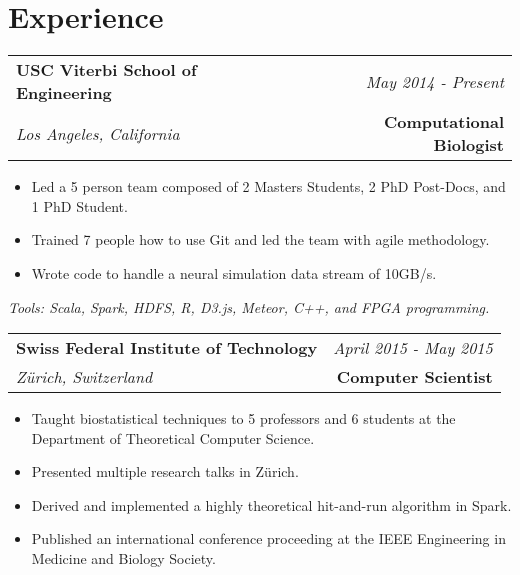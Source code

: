\documentclass[10pt,a4paper]{article}
\begin{document}
  \vspace*{-15mm}\section*{Experience}
  \noindent\begin{tabularx}{17cm}{X r}
    \textbf{USC Viterbi School of Engineering} & \textit{May 2014 - Present} \\
    \textit{Los Angeles, California} & \textbf{Computational Biologist} \\
  \end{tabularx}

  \vspace*{1mm}\noindent\begin{minipage}{17cm}
    \begin{itemize}[leftmargin=6mm,topsep=0mm,itemsep=-1mm]
      \item Led a 5 person team composed of 2 Masters Students, 2 PhD Post-Docs, and 1 PhD Student.
      \item Trained 7 people how to use Git and led the team with agile methodology.
      \item Wrote code to handle a neural simulation data stream of 10GB/s.
    \end{itemize}
  \end{minipage}

  \vspace*{2mm}\setlength\parindent{2mm}\begin{minipage}{16.8cm}
    \textit{Tools: Scala, Spark, HDFS, R, D3.js, Meteor, C++, and FPGA programming.}
  \end{minipage}

  \vspace*{3mm}\noindent\begin{tabularx}{17cm}{X r}
    \textbf{Swiss Federal Institute of Technology} & \textit{April 2015 - May 2015} \\
    \textit{Z{\"u}rich, Switzerland} & \textbf{Computer Scientist} \\
  \end{tabularx}

  \vspace*{1mm}\noindent\begin{minipage}{17cm}
    \begin{itemize}[leftmargin=6mm,topsep=0mm,itemsep=-1mm]
      \item Taught biostatistical techniques to 5 professors and 6 students at the Department of Theoretical Computer Science. 
      \item Presented multiple research talks in Z{\"u}rich.
      \item Derived and implemented a highly theoretical hit-and-run algorithm in Spark.
      \item Published an international conference proceeding at the IEEE Engineering in Medicine and Biology Society.
    \end{itemize}
  \end{minipage}
\end{document}
